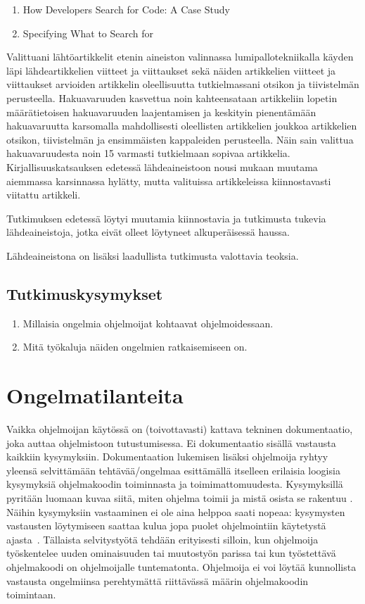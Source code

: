\documentclass[finnish]{tktltiki2}
\theoremstyle{definition}
\theoremstyle{remark}
\begin{document}
\begin{enumerate}
  \item How Developers Search for Code: A Case Study~\cite{g_search_code}
  \item Specifying What to Search for~\cite{what-to-search-for}
\end{enumerate}
Valittuani lähtöartikkelit etenin aineiston valinnassa lumipallotekniikalla
käyden läpi lähdeartikkelien viitteet ja viittaukset sekä näiden artikkelien viitteet ja viittaukset arvioiden artikkelin oleellisuutta tutkielmassani otsikon ja tiivistelmän perusteella. Hakuavaruuden kasvettua noin kahteensataan artikkeliin lopetin määrätietoisen hakuavaruuden laajentamisen ja keskityin pienentämään hakuavaruutta karsomalla mahdollisesti oleellisten artikkelien joukkoa artikkelien otsikon, tiivistelmän ja ensimmäisten kappaleiden perusteella. Näin sain valittua hakuavaruudesta noin 15 varmasti tutkielmaan sopivaa artikkelia.  Kirjallisuuskatsauksen edetessä lähdeaineistoon nousi mukaan muutama aiemmassa karsinnassa hylätty, mutta valituissa artikkeleissa kiinnostavasti viitattu artikkeli.

Tutkimuksen edetessä löytyi muutamia kiinnostavia ja tutkimusta tukevia lähdeaineistoja, jotka eivät olleet löytyneet alkuperäisessä haussa.

Lähdeaineistona on lisäksi laadullista tutkimusta valottavia teoksia.

\subsection{Tutkimuskysymykset}
\begin{enumerate}
\item Millaisia ongelmia ohjelmoijat kohtaavat ohjelmoidessaan.
\item Mitä työkaluja näiden ongelmien ratkaisemiseen on.
\end{enumerate}

\section{Ongelmatilanteita}

Vaikka ohjelmoijan käytössä on (toivottavasti) kattava tekninen dokumentaatio, joka auttaa ohjelmistoon tutustumisessa. Ei dokumentaatio sisällä vastausta kaikkiin kysymyksiin. Dokumentaation lukemisen lisäksi ohjelmoija ryhtyy yleensä selvittämään tehtävää/ongelmaa esittämällä itselleen erilaisia loogisia kysymyksiä ohjelmakoodin toiminnasta ja toimimattomuudesta. Kysymyksillä pyritään luomaan kuvaa siitä, miten ohjelma toimii ja mistä osista se rakentuu \cite{g_search_code, questions-during-software-evolution-tasks,asking-and-answering-api-questions}. Näihin kysymyksiin vastaaminen ei ole aina helppoa saati nopeaa: kysymysten vastausten löytymiseen saattaa kulua jopa puolet ohjelmointiin käytetystä ajasta~\cite{eliciting-design-requirements-for-maintenance-oriented-ides}.
Tällaista selvitystyötä tehdään erityisesti silloin, kun ohjelmoija työskentelee uuden ominaisuuden tai muutostyön parissa tai kun työstettävä ohjelmakoodi on ohjelmoijalle tuntematonta. Ohjelmoija ei voi löytää kunnollista vastausta ongelmiinsa perehtymättä riittävässä määrin ohjelmakoodin toimintaan.
\end{document}
